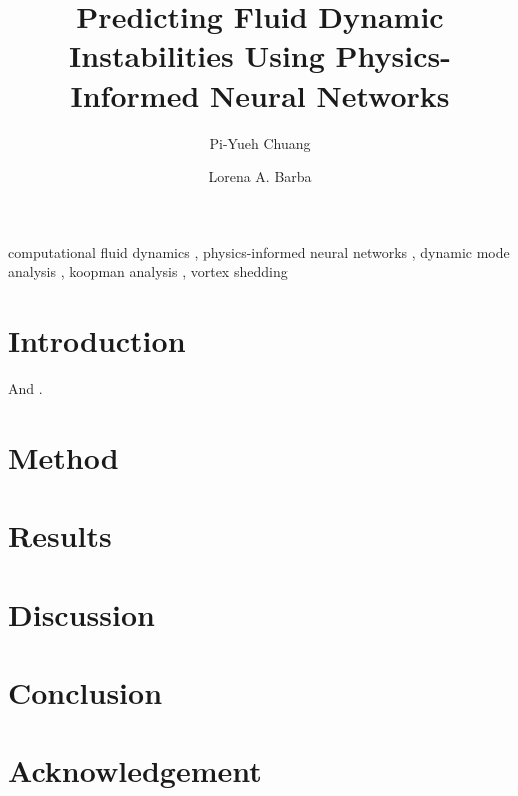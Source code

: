 \documentclass[5p, twocolumn, times, sort&compress]{elsarticle}
\begin{document}
    \begin{frontmatter}
        \title{%
            Predicting Fluid Dynamic Instabilities Using Physics-Informed Neural Networks%
        }

        \author[1]{Pi-Yueh Chuang}
        \author[1]{Lorena A. Barba}

        \begin{abstract}
            \lipsum[1]%
        \end{abstract}

        \begin{keyword}
            computational fluid dynamics \sep
            physics-informed neural networks \sep
            dynamic mode analysis \sep
            koopman analysis \sep
            vortex shedding
        \end{keyword}
    \end{frontmatter}

    \section{Introduction}
    \lipsum[1-5] And \cite{chen_variants_2012, rowley_spectral_2009, rahaman_spectral_2019}.

    \section{Method}
    

    \section{Results}
    

    \section{Discussion}
    \lipsum[5]

    \section{Conclusion}
    \lipsum[6]

    \section*{Acknowledgement}
    \lipsum[7]

    
\end{document}
